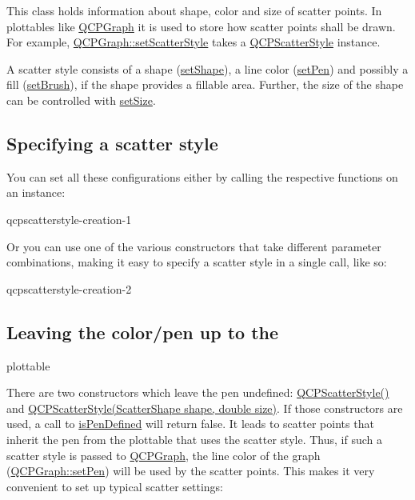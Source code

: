 This class holds information about shape, color and size of scatter points. In plottables like \hyperlink{class_q_c_p_graph}{Q\+C\+P\+Graph} it is used to store how scatter points shall be drawn. For example, \hyperlink{class_q_c_p_graph_a12bd17a8ba21983163ec5d8f42a9fea5}{Q\+C\+P\+Graph\+::set\+Scatter\+Style} takes a \hyperlink{class_q_c_p_scatter_style}{Q\+C\+P\+Scatter\+Style} instance.

A scatter style consists of a shape (\hyperlink{class_q_c_p_scatter_style_a7c641c4d4c6d29cb705d3887cfce91c1}{set\+Shape}), a line color (\hyperlink{class_q_c_p_scatter_style_a761f1f229cc0ca4703e1e2b89f6dd1ba}{set\+Pen}) and possibly a fill (\hyperlink{class_q_c_p_scatter_style_a74d692aaeb8d4b36d6f7d510e44264b1}{set\+Brush}), if the shape provides a fillable area. Further, the size of the shape can be controlled with \hyperlink{class_q_c_p_scatter_style_aaefdd031052892c4136129db68596e0f}{set\+Size}.\hypertarget{class_q_c_p_scatter_style_QCPScatterStyle-defining}{}\subsection{Specifying a scatter style}\label{class_q_c_p_scatter_style_QCPScatterStyle-defining}
You can set all these configurations either by calling the respective functions on an instance\+: 
\begin{DoxyCodeInclude}
\end{DoxyCodeInclude}
qcpscatterstyle-\/creation-\/1

Or you can use one of the various constructors that take different parameter combinations, making it easy to specify a scatter style in a single call, like so\+: 
\begin{DoxyCodeInclude}
\end{DoxyCodeInclude}
qcpscatterstyle-\/creation-\/2\hypertarget{class_q_c_p_scatter_style_QCPScatterStyle-undefinedpen}{}\subsection{Leaving the color/pen up to the}\label{class_q_c_p_scatter_style_QCPScatterStyle-undefinedpen}
plottable

There are two constructors which leave the pen undefined\+: \hyperlink{class_q_c_p_scatter_style_a8836018d9ad83ccd8870de8315c1be73}{Q\+C\+P\+Scatter\+Style()} and \hyperlink{class_q_c_p_scatter_style_a003d92f74f4561eda111862eadd62f28}{Q\+C\+P\+Scatter\+Style(\+Scatter\+Shape shape, double size)}. If those constructors are used, a call to \hyperlink{class_q_c_p_scatter_style_a7f1385a8d5e4f349a6b8030723fbd0f7}{is\+Pen\+Defined} will return false. It leads to scatter points that inherit the pen from the plottable that uses the scatter style. Thus, if such a scatter style is passed to \hyperlink{class_q_c_p_graph}{Q\+C\+P\+Graph}, the line color of the graph (\hyperlink{class_q_c_p_abstract_plottable_ab74b09ae4c0e7e13142fe4b5bf46cac7}{Q\+C\+P\+Graph\+::set\+Pen}) will be used by the scatter points. This makes it very convenient to set up typical scatter settings\+:


